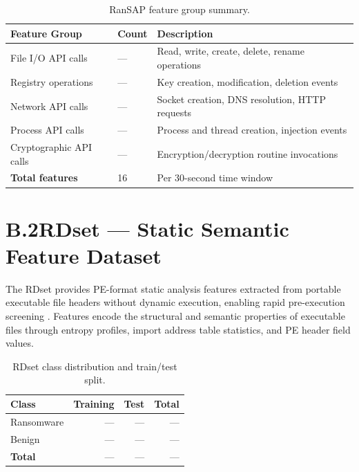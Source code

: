 \begin{table}[ht]
\centering
\caption{RanSAP feature group summary.}
\label{tab:app_ransap_features}
\begin{tabular}{@{}lll@{}}
\toprule
\textbf{Feature Group} & \textbf{Count} & \textbf{Description} \\
\midrule
File I/O API calls        & ---  & Read, write, create, delete, rename operations \\
Registry operations       & ---  & Key creation, modification, deletion events \\
Network API calls         & ---  & Socket creation, DNS resolution, HTTP requests \\
Process API calls         & ---  & Process and thread creation, injection events \\
Cryptographic API calls   & ---  & Encryption/decryption routine invocations \\
\midrule
\textbf{Total features}   & 16   & Per 30-second time window \\
\bottomrule
\end{tabular}
\end{table}

\section*{B.2\quad RDset — Static Semantic Feature Dataset}

The RDset provides PE-format static analysis features extracted from portable executable
file headers without dynamic execution, enabling rapid pre-execution screening
\cite{GogineniDV22ForeseerRanSAP}.
Features encode the structural and semantic properties of executable files through entropy
profiles, import address table statistics, and PE header field values.

\begin{table}[ht]
\centering
\caption{RDset class distribution and train/test split.}
\label{tab:app_rdset}
\begin{tabular}{@{}lrrr@{}}
\toprule
\textbf{Class} & \textbf{Training} & \textbf{Test} & \textbf{Total} \\
\midrule
Ransomware      & ---  & ---  & --- \\
Benign          & ---  & ---  & --- \\
\midrule
\textbf{Total}  & ---  & ---  & --- \\
\bottomrule
\end{tabular}
\end{table}


